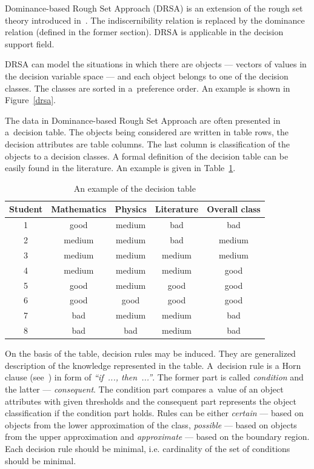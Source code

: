 Dominance-based Rough Set Approach (DRSA) is an extension of the rough set
theory introduced in~\cite{GMS01, GMS02, GMS05}. The indiscernibility relation
is replaced by the dominance relation (defined in the former section). DRSA is
applicable in the decision support field.

DRSA can model the situations in which there are objects --- vectors of values
in the decision variable space --- and each object belongs to one of the
decision classes. The classes are sorted in a~preference order. An example is
shown in Figure~\ref{drsa}.

The data in Dominance-based Rough Set Approach are often presented in
a~decision table. The objects being considered are written in table rows, the
decision attributes are table columns. The last column is classification of
the objects to a decision classes. A formal definition of the decision table
can be easily found in the literature. An example is given in
Table~\ref{t:dec_tab-example}.

\begin{table}
  \centering
  \begin{tabular}{c c c c | c}
   \hline
   Student & Mathematics & Physics & Literature & Overall class \\
   \hline
   \hline
   1 & good & medium & bad & bad \\
   2 & medium & medium & bad & medium \\
   3 & medium & medium & medium & medium \\
   4 & medium & medium & medium & good \\
   5 & good & medium & good & good \\
   6 & good & good & good & good \\
   7 & bad & medium & medium & bad \\
   8 & bad & bad & medium & bad \\
   \hline
  \end{tabular}
  \caption{An example of the decision table}
  \label{t:dec_tab-example}
\end{table}

On the basis of the table, decision rules may be induced. They are generalized
description of the knowledge represented in the table. A~decision rule is a
Horn clause (see~\cite{Hor51}) in form of \textit{``if~..., then~...''}. The
former part is called \textit{condition} and the latter ---
\textit{consequent}. The condition part compares a~value of an object
attributes with given thresholds and the consequent part represents the object
classification if the condition part holds. Rules can be either
\textit{certain} --- based on objects from the lower approximation of the
class, \textit{possible} --- based on objects from the upper approximation and
\textit{approximate} --- based on the boundary region. Each decision rule
should be minimal, i.e. cardinality of the set of conditions should be
minimal.

